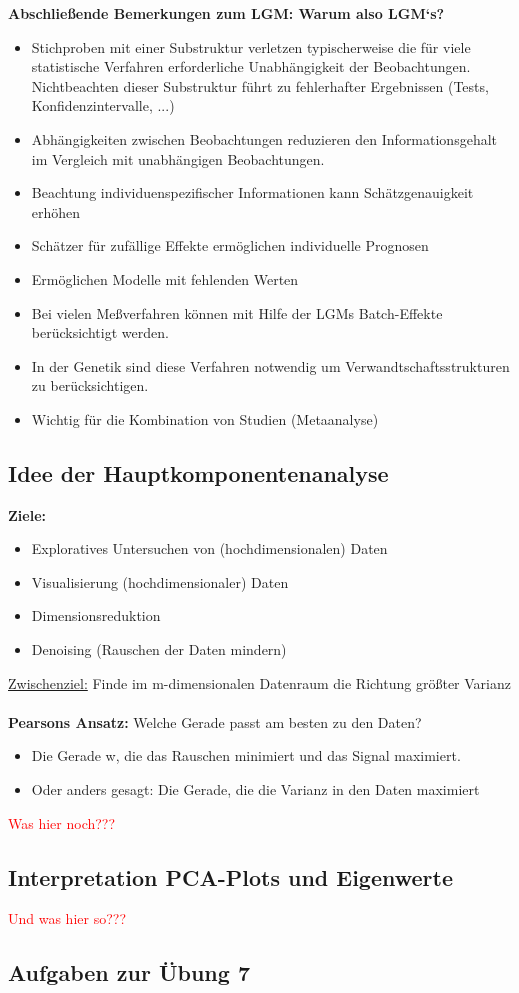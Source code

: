 \newpage
\textbf{Abschließende Bemerkungen zum LGM: Warum also LGM‘s?}
\begin{itemize}
	\item Stichproben mit einer Substruktur verletzen typischerweise die für viele statistische Verfahren erforderliche Unabhängigkeit der Beobachtungen. Nichtbeachten dieser Substruktur führt zu fehlerhafter Ergebnissen (Tests, Konfidenzintervalle, ...)
	\item Abhängigkeiten zwischen Beobachtungen reduzieren den Informationsgehalt im Vergleich mit unabhängigen Beobachtungen.
	\item Beachtung individuenspezifischer Informationen kann Schätzgenauigkeit erhöhen
	\item Schätzer für zufällige Effekte ermöglichen individuelle Prognosen
	\item Ermöglichen Modelle mit fehlenden Werten
	\item Bei vielen Meßverfahren können mit Hilfe der LGMs Batch-Effekte berücksichtigt werden.
	\item In der Genetik sind diese Verfahren notwendig um Verwandtschaftsstrukturen zu berücksichtigen.
	\item Wichtig für die Kombination von Studien (Metaanalyse)
\end{itemize}

\newpage
\subsection{Idee der Hauptkomponentenanalyse}
\textbf{Ziele:}
\begin{itemize}
	\item Exploratives Untersuchen von (hochdimensionalen) Daten
	\item Visualisierung (hochdimensionaler) Daten
	\item Dimensionsreduktion
	\item Denoising (Rauschen der Daten mindern)
\end{itemize}
 
\underline{Zwischenziel:} Finde im m-dimensionalen Datenraum die Richtung größter Varianz
\\\\
\textbf{Pearsons Ansatz:} Welche Gerade passt am besten zu den Daten?
\begin{itemize}
	\item Die Gerade w, die das Rauschen minimiert und das Signal maximiert.
	\item Oder anders gesagt: Die Gerade, die die Varianz in den Daten maximiert
\end{itemize}

\textcolor{red}{Was hier noch???}

\subsection{Interpretation PCA-Plots und Eigenwerte}
\textcolor{red}{Und was hier so???}

\subsection{Aufgaben zur Übung 7}